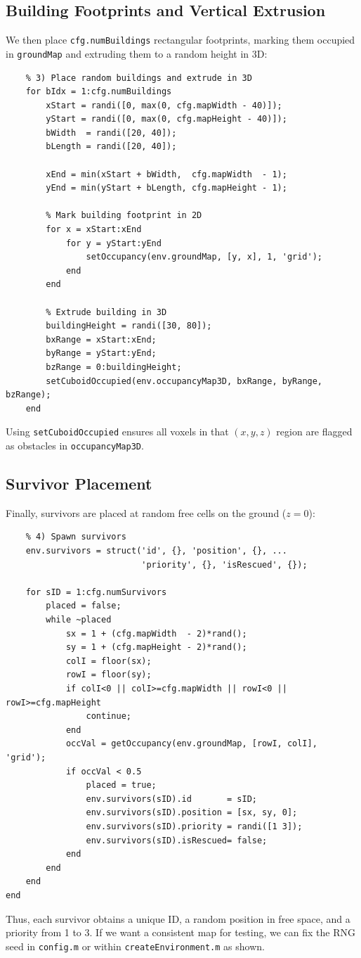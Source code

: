 \documentclass[12pt,a4paper]{report}
\begin{document}
\subsection*{Building Footprints and Vertical Extrusion}
We then place \texttt{cfg.numBuildings} rectangular footprints, marking them occupied 
in \texttt{groundMap} and extruding them to a random height in 3D:
\begin{verbatim}
    % 3) Place random buildings and extrude in 3D
    for bIdx = 1:cfg.numBuildings
        xStart = randi([0, max(0, cfg.mapWidth - 40)]);
        yStart = randi([0, max(0, cfg.mapHeight - 40)]);
        bWidth  = randi([20, 40]);
        bLength = randi([20, 40]);

        xEnd = min(xStart + bWidth,  cfg.mapWidth  - 1);
        yEnd = min(yStart + bLength, cfg.mapHeight - 1);

        % Mark building footprint in 2D
        for x = xStart:xEnd
            for y = yStart:yEnd
                setOccupancy(env.groundMap, [y, x], 1, 'grid');
            end
        end

        % Extrude building in 3D
        buildingHeight = randi([30, 80]);
        bxRange = xStart:xEnd;
        byRange = yStart:yEnd;
        bzRange = 0:buildingHeight;
        setCuboidOccupied(env.occupancyMap3D, bxRange, byRange, bzRange);
    end
\end{verbatim}
Using \texttt{setCuboidOccupied} ensures all voxels in that $(x,y,z)$ region are flagged 
as obstacles in \texttt{occupancyMap3D}.

\subsection*{Survivor Placement}
Finally, survivors are placed at random free cells on the ground (\(z=0\)):
\begin{verbatim}
    % 4) Spawn survivors
    env.survivors = struct('id', {}, 'position', {}, ...
                           'priority', {}, 'isRescued', {});

    for sID = 1:cfg.numSurvivors
        placed = false;
        while ~placed
            sx = 1 + (cfg.mapWidth  - 2)*rand();
            sy = 1 + (cfg.mapHeight - 2)*rand();
            colI = floor(sx);
            rowI = floor(sy);
            if colI<0 || colI>=cfg.mapWidth || rowI<0 || rowI>=cfg.mapHeight
                continue;
            end
            occVal = getOccupancy(env.groundMap, [rowI, colI], 'grid');
            if occVal < 0.5
                placed = true;
                env.survivors(sID).id       = sID;
                env.survivors(sID).position = [sx, sy, 0];
                env.survivors(sID).priority = randi([1 3]);
                env.survivors(sID).isRescued= false;
            end
        end
    end
end
\end{verbatim}
Thus, each survivor obtains a unique ID, a random position in free space, and a 
priority from 1 to 3. If we want a consistent map for testing, we can fix the RNG 
seed in \texttt{config.m} or within \texttt{createEnvironment.m} as shown.
\end{document}
